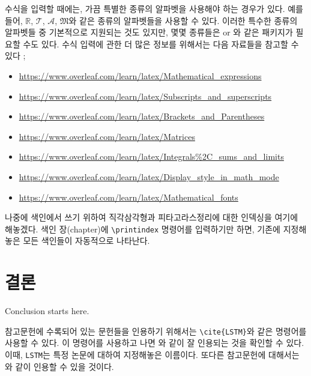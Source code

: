 \documentclass{report}
\begin{document}
수식을 입력할 때에는, 가끔 특별한 종류의 알파벳을 사용해야 하는 경우가 있다.
예를 들어, \(\mathbb R\), \(\mathcal T\), \(\mathscr A\), \(\mathfrak M\)와 같은 종류의 알파벳들을 사용할 수 있다.
이러한 특수한 종류의 알파벳들 중 기본적으로 지원되는 것도 있지만, 몇몇 종류들은  or 와 같은 패키지가 필요할 수도 있다.
수식 입력에 관한 더 많은 정보를 위해서는 다음 자료들을 참고할 수 있다 ;
\begin{itemize}
\item
\url{https://www.overleaf.com/learn/latex/Mathematical_expressions}
\item
\url{https://www.overleaf.com/learn/latex/Subscripts_and_superscripts}
\item
\url{https://www.overleaf.com/learn/latex/Brackets_and_Parentheses}
\item
\url{https://www.overleaf.com/learn/latex/Matrices}
\item
\url{https://www.overleaf.com/learn/latex/Integrals\%2C_sums_and_limits}
\item
\url{https://www.overleaf.com/learn/latex/Display_style_in_math_mode}
\item
\url{https://www.overleaf.com/learn/latex/Mathematical_fonts}
\end{itemize}

나중에 색인에서 쓰기 위하여 직각삼각형과 피타고라스정리에 대한 인덱싱을 여기에 해놓겠다.
색인 장(chapter)에 \verb|\printindex| 명령어를 입력하기만 하면, 기존에 지정해놓은 모든 색인들이 자동적으로 나타난다.

\chapter{결론}\label{chap:conclusion}
Conclusion starts here.

참고문헌에 수록되어 있는 문헌들을 인용하기 위해서는 \verb|\cite{LSTM}|와 같은 명령어를 사용할 수 있다.
이 명령어를 사용하고 나면 \cite{LSTM}와 같이 잘 인용되는 것을 확인할 수 있다.
이때, \texttt{LSTM}는 특정 논문에 대하여 지정해놓은 이름이다.
또다른 참고문헌에 대해서는 \cite{pure}와 같이 인용할 수 있을 것이다.
\end{document}

